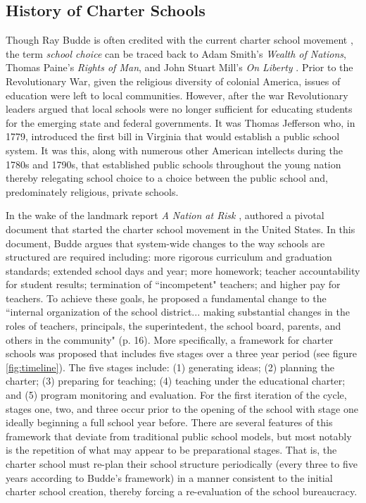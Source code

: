 \documentclass[letterpaper,12p,twoside]{article} %
\begin{document}
\subsection{History of Charter Schools}
Though Ray Budde is often credited with the current charter school movement \cite{kolderie05}, the term \textit{school choice} can be traced back to Adam Smith's \textit{Wealth of Nations}, Thomas Paine's \textit{Rights of Man}, and John Stuart Mill's \textit{On Liberty} \cite{herbst2006}. Prior to the Revolutionary War, given the religious diversity of colonial America, issues of education were left to local communities. However, after the war Revolutionary leaders argued that local schools were no longer sufficient for educating students for the emerging state and federal governments. It was Thomas Jefferson who, in 1779, introduced the first bill in Virginia that would establish a public school system. It was this, along with numerous other American intellects during the 1780s and 1790s, that established public schools throughout the young nation thereby relegating school choice to a choice between the public school and, predominately religious, private schools.

In the wake of the landmark report \textit{A Nation at Risk} \cite{nationatrisk},  authored a pivotal document that started the charter school movement in the United States. In this document, Budde argues that system-wide changes to the way schools are structured are required including: more rigorous curriculum and graduation standards; extended school days and year; more homework; teacher accountability for student results; termination of ``incompetent" teachers; and higher pay for teachers. To achieve these goals, he proposed a fundamental change to the ``internal organization of the school district... making substantial changes in the roles of teachers, principals, the superintedent, the school board, parents, and others in the community" (p. 16). More specifically, a framework for charter schools was proposed that includes five stages over a three year period (see figure \ref{fig:timeline}). The five stages include: (1) generating ideas; (2) planning the charter; (3) preparing for teaching; (4) teaching under the educational charter; and (5) program monitoring and evaluation. For the first iteration of the cycle, stages one, two, and three occur prior to the opening of the school with stage one ideally beginning a full school year before. There are several features of this framework that deviate from traditional public school models, but most notably is the repetition of what may appear to be preparational stages. That is, the charter school must re-plan their school structure periodically (every three to five years according to Budde's framework) in a manner consistent to the initial charter school creation, thereby forcing a re-evaluation of the school bureaucracy.
\end{document}
